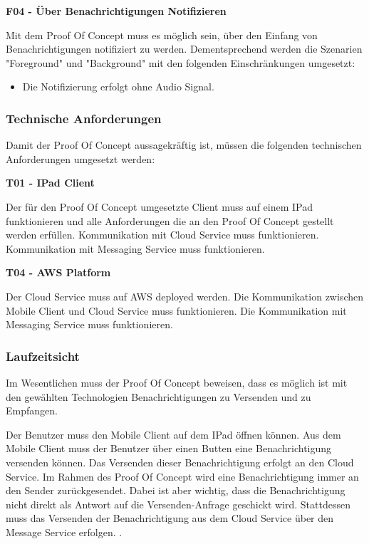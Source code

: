 \textbf{F04 - Über Benachrichtigungen Notifizieren}

Mit dem Proof Of Concept muss es möglich sein, über den Einfang von Benachrichtigungen notifiziert zu werden.
Dementsprechend werden die Szenarien "Foreground" und "Background" mit den folgenden Einschränkungen umgesetzt:

\begin{itemize}
    \item Die Notifizierung erfolgt ohne Audio Signal.
\end{itemize}

\clearpage
\subsubsection{Technische Anforderungen}

Damit der Proof Of Concept aussagekräftig ist, müssen die folgenden technischen Anforderungen umgesetzt werden:

\textbf{T01 - IPad Client}

Der für den Proof Of Concept umgesetzte Client muss auf einem IPad funktionieren und alle Anforderungen die an den
Proof Of Concept gestellt werden erfüllen. Kommunikation mit Cloud Service muss funktionieren. Kommunikation mit Messaging Service muss funktionieren.


\textbf{T04 - AWS Platform}

Der Cloud Service muss auf AWS deployed werden. Die Kommunikation zwischen Mobile Client und Cloud Service muss funktionieren.
Die Kommunikation mit Messaging Service muss funktionieren.


\subsubsection{Laufzeitsicht}

Im Wesentlichen muss der Proof Of Concept beweisen, dass es möglich ist mit den gewählten Technologien Benachrichtigungen zu Versenden und zu Empfangen.

Der Benutzer muss den Mobile Client auf dem IPad öffnen können. Aus dem Mobile Client muss der Benutzer über einen Butten eine Benachrichtigung versenden können.
Das Versenden dieser Benachrichtigung erfolgt an den Cloud Service.
Im Rahmen des Proof Of Concept wird eine Benachrichtigung immer an den Sender zurückgesendet. Dabei ist aber wichtig, dass die Benachrichtigung nicht direkt als
Antwort auf die Versenden-Anfrage geschickt wird. Stattdessen muss das Versenden der Benachrichtigung aus dem Cloud Service über den Message Service erfolgen. .

